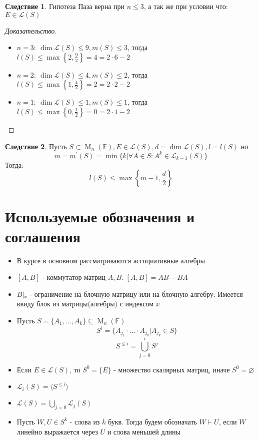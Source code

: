 \documentclass[a4paper, 14pt]{extarticle}
\theoremstyle{definition}
\newtheorem{conseq}{Следствие}
\begin{document}
\begin{conseq}
	Гипотеза Паза верна при \(n \leqslant 3\), а так же при условии что: \(E \in \mathcal{L}(S)\)
\end{conseq}

\begin{proof}[Доказательство]
	\leavevmode
	\begin{itemize}
		\item \(n = 3:\ \operatorname{dim} \mathcal{L}(S) \leqslant 9, m(S) \leqslant 3\), тогда \(l(S) \leqslant \operatorname{max} \left\{ 2, \frac{9}{2} \right\} = 4 = 2 \cdot 6 - 2\)
		
		\item \(n = 2:\ \operatorname{dim} \mathcal{L}(S) \leqslant 4, m(S) \leqslant 2\), тогда \(l(S) \leqslant \operatorname{max} \left\{ 1, \frac{4}{2} \right\} = 2 = 2 \cdot 2 - 2\)
		
		\item \(n = 1:\ \operatorname{dim} \mathcal{L}(S) \leqslant 1, m(S) \leqslant 1\), тогда \(l(S) \leqslant \operatorname{max} \left\{ 0, \frac{1}{2} \right\} = 0 = 2 \cdot 1 - 2\)
	\end{itemize}
\end{proof}

\begin{conseq}
	Пусть \(S \subset \operatorname{M}_n(\mathbb{F}), E \in \mathcal{L}(S), d = \operatorname{dim} \mathcal{L}(S), l = l(S)\) но
	\[m = m^{\prime}(S) = \operatorname{min} \{k | \forall A \in S : A^k \in \mathcal{L}_{k - 1}(S)\}\]
	Тогда:
	\[l(S) \leqslant \operatorname{max} \left\{ m - 1, \frac{d}{2} \right\}\]
\end{conseq}

\newpage
\section{Используемые обозначения и соглашения}

\begin{itemize}
	\item В курсе в основном рассматриваются ассоциативные алгебры
	\item \([A, B]\) - коммутатор матриц \(A, B\). \([A, B] = AB - BA\)
	\item \(B \left|_{x} \right.\) - ограничение на блочную матрицу или на блочную алгебру. Имеется ввиду блок из матрицы(алгебры) с индексом \(x\)
	\item Пусть \(S = \{A_1, \dots, A_k\} \subseteq \operatorname{M}_n(\mathbb{F})\)
	\[S^i = \{A_{j_1} \cdot \dots \cdot A_{j_k} | A_{j_k} \in S\}\]
	\[S^{\leqslant i} = \bigcup\limits_{j = 0}^i S^{j}\]
	\item Если \(E \in \mathcal{L}(S)\), то \(S^0 = \{E\}\) - множество скалярных матриц, иначе \(S^0 = \varnothing\)
	\item \(\mathcal{L}_i(S) = \langle S^{\leqslant i} \rangle\)
	\item \(\mathcal{L}(S) = \bigcup\limits_{j = 0} \mathcal{L}_j(S)\)
	\item Пусть \(W, U \in S^k\) - слова из \(k\) букв. Тогда будем обозначать \(W \vdash U\), если \(W\) линейно выражается через \(U\) и слова меньшей длины
\end{itemize}
\end{document}
